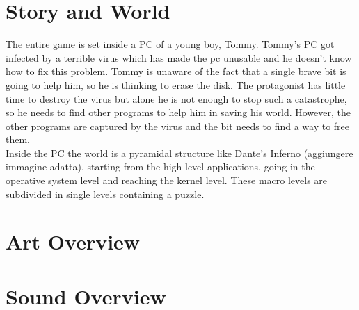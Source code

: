 \documentclass[12pt, a4paper]{report}
\begin{document}
\chapter{Story and World}
The entire game is set inside a PC of a young boy, Tommy. Tommy’s PC got infected by a terrible virus which has made the pc unusable and he doesn’t know how to fix this problem. Tommy is unaware of the fact that a single brave bit is going to help him, so he is thinking to erase the disk. The protagonist has little time to destroy the virus but alone he is not enough to stop such a catastrophe, so he needs to find other programs to help him in saving his world. However, the other programs are captured by the virus and the bit needs to find a way to free them.\\
Inside the PC the world is a pyramidal structure like Dante’s Inferno (aggiungere immagine adatta), starting from the high level applications, going in the operative system level and reaching the kernel level. These macro levels are subdivided in single levels containing a puzzle.

\chapter{Art Overview}
\chapter{Sound Overview}
\end{document}
